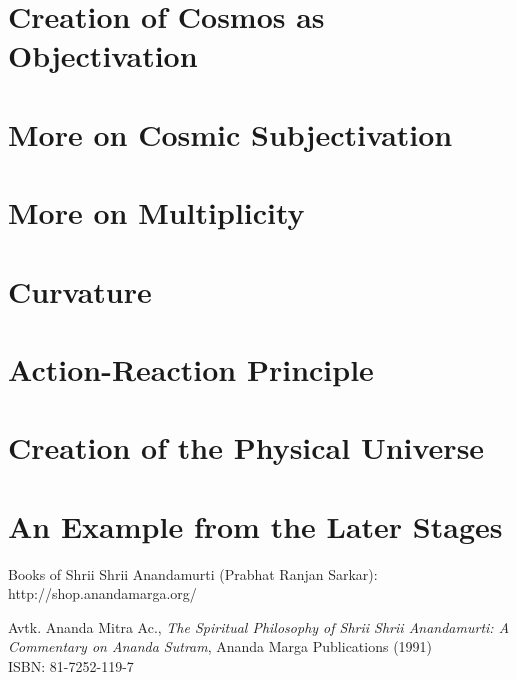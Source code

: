 \documentclass[12pt]{book}
\begin{document}
\chapter{Creation of Cosmos as Objectivation}
 
 
\chapter{More on Cosmic Subjectivation}
 
 
\chapter{More on Multiplicity} 
 
 
 
 
\chapter{Curvature}
 
 
\chapter{Action-Reaction Principle}
 
 
\chapter{Creation of the Physical Universe}   
 
 
 
 
 
\chapter{An Example from the Later Stages}
 
 
\backmatter
 
\begin{thebibliography}{99}
  
Books of Shrii Shrii Anandamurti (Prabhat Ranjan Sarkar): \\
http://shop.anandamarga.org/
 
Avtk. Ananda Mitra Ac., \emph{The Spiritual Philosophy of Shrii Shrii Anandamurti: A Commentary on Ananda Sutram}, Ananda Marga Publications (1991) \\
ISBN: 81-7252-119-7
 
\end{thebibliography}
 
\end{document}
